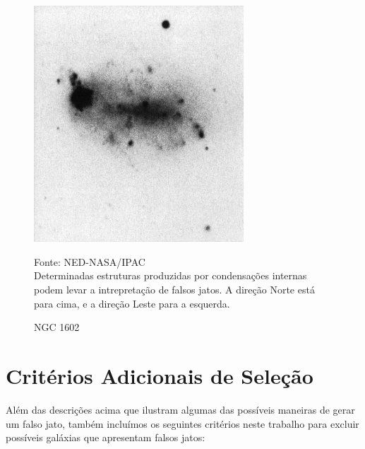 \begin{enumerate}
\begin{figure}[H]
	\centering	
    \caption{NGC 1602}
    \includegraphics[width=0.7\textwidth]{figuras/ngc1602.jpg}
   	\begin{center}
        \normalsize Fonte: NED-NASA/IPAC \\Determinadas estruturas produzidas por condensações internas podem levar a intrepretação de falsos jatos. A direção Norte está para cima, e a direção Leste para a esquerda.
    \end{center}
	\label{fig:1602}
\end{figure}

\end{enumerate}

\section{Critérios Adicionais de Seleção}

 Além das descrições acima que ilustram algumas das possíveis maneiras de gerar um falso jato, também incluímos os seguintes critérios neste trabalho para excluir possíveis galáxias que apresentam falsos jatos:

